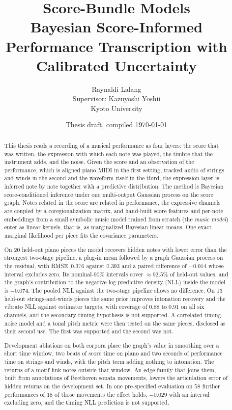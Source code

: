 \documentclass[11pt,a4paper]{report}
\title{\textbf{Score-Bundle Models}\\[0.3em]
  \large Bayesian Score-Informed Performance Transcription
  with Calibrated Uncertainty}
\author{Raynaldi Lalang \\[0.5em]
  \small Supervisor: Kazuyoshi Yoshii \\
  \small Kyoto University}
\date{Thesis draft, compiled \today}
\newcommand{\nConfPieces}{20}
\newcommand{\rmseGP}{0.376}            %
\newcommand{\covGP}{92.5\%}
\newcommand{\rmseConfOldHead}{0.393}   %
\newcommand{\dRmseConf}{$-0.014$}      %
\newcommand{\dNllGraphConf}{$-0.074$}  %
\begin{document}
\maketitle

\begin{abstract}
\noindent This thesis reads a recording of a musical performance as four
layers: the score that was written, the expression with which each note was
played, the timbre that the instrument adds, and the noise. Given the score
and an observation of the performance, which is aligned piano MIDI in the
first setting, tracked audio of strings and winds in the second and the
waveform itself in the third, the expression layer is inferred note by note
together with a predictive distribution. The method is Bayesian
score-conditioned inference under one multi-output Gaussian process on the
score graph. Notes related in the score are related in performance, the
expressive channels are coupled by a coregionalization matrix, and
hand-built score features and per-note embeddings from a small symbolic
music model trained from scratch (the \emph{music model}) enter as linear
kernels, that is, as marginalized Bayesian linear means. One exact marginal
likelihood per piece fits the covariance parameters.

On \nConfPieces{} held-out piano pieces the model recovers hidden notes with
lower error than the strongest two-stage pipeline, a plug-in mean followed
by a graph Gaussian process on the residual, with RMSE~\rmseGP{} against
\rmseConfOldHead{} and a paired difference of \dRmseConf{} whose interval
excludes zero. Its nominal-90\% intervals cover $\approx\covGP$ of held-out
values, and the graph's contribution to the negative log predictive density
(NLL) inside the model is \dNllGraphConf{}. The pooled NLL against the
two-stage pipeline shows no difference. On 13 held-out strings-and-winds
pieces the same prior improves intonation recovery and the vibrato NLL
against estimator targets, with coverage of $0.88$ to $0.91$ on all six channels, and the
secondary timing hypothesis is not supported. A correlated timing-noise
model and a tonal pitch metric were then tested on the same pieces,
disclosed as their second use. The first was supported and the second was
not.

Development ablations on both corpora place the graph's value in smoothing
over a short time window, two beats of score time on piano and two seconds
of performance time on strings and winds, with the pitch term adding nothing
to intonation. The returns of a motif link notes outside that window. An
edge family that joins them, built from annotations of Beethoven sonata
movements, lowers the articulation error of hidden returns on the development set. In
one pre-specified evaluation on $58$ further performances of $18$ of those
movements the effect holds, $-0.029$ with an interval excluding zero, and
the timing NLL prediction is not supported.


\end{abstract}
\end{document}
